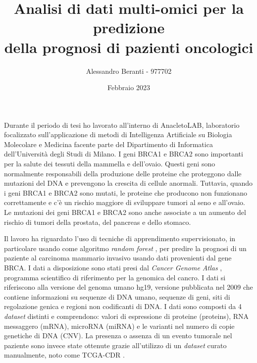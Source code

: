 \documentclass[12pt]{article}
\begin{document}
	
	\title{{\Large
			\textbf{\textmd{Analisi di dati multi-omici per la predizione\\ \vspace{0.5cm} della prognosi di pazienti oncologici}}}}
	
	\author{Alessandro Beranti - 977702}
	
	\date{Febbraio 2023}
	
	\maketitle
	
	\vspace{1cm}
	Durante il periodo di tesi ho lavorato all'interno di AnacletoLAB, laboratorio focalizzato sull'applicazione di metodi di Intelligenza Artificiale su Biologia Molecolare e Medicina facente parte del Dipartimento di Informatica dell'Università degli Studi di Milano.
	I geni BRCA1 e BRCA2 sono importanti per la salute dei tessuti della mammella e dell'ovaio. Questi geni sono normalmente responsabili della produzione delle proteine che proteggono dalle mutazioni del DNA e prevengono la crescita di cellule anormali. Tuttavia, quando i geni BRCA1 e BRCA2 sono mutati, le proteine che producono non funzionano correttamente e c'è un rischio maggiore di sviluppare tumori al seno e all'ovaio. Le mutazioni dei geni BRCA1 e BRCA2 sono anche associate a un aumento del rischio di tumori della prostata, del pancreas e dello stomaco.
	
	Il lavoro ha riguardato l'uso di tecniche di apprendimento supervisionato, in particolare usando come algoritmo \textit{random forest} \cite{breiman2001random}, per predire la prognosi di un paziente al carcinoma mammario invasivo usando dati provenienti dal gene BRCA.
	I dati a disposizione sono stati presi dal \textit{Cancer Genome Atlas} \cite{TCGASource}, programma scientifico di riferimento per la genomica del cancro. I dati si riferiscono alla versione del genoma umano hg19, versione pubblicata nel 2009 che contiene informazioni su sequenze di DNA umano, sequenze di geni, siti di regolazione genica e regioni non codificanti di DNA. I  dati sono composti da 4 \textit{dataset} distinti e comprendono: valori di espressione di proteine (proteins), RNA messaggero (mRNA), microRNA (miRNA) e le varianti nel numero di copie genetiche di DNA (CNV). 
	La presenza o assenza di un evento tumorale nel paziente sono invece state ottenute grazie all'utilizzo di un \textit{dataset} curato manualmente, noto come TCGA-CDR \cite{LIU2018400}.
	
\end{document}
